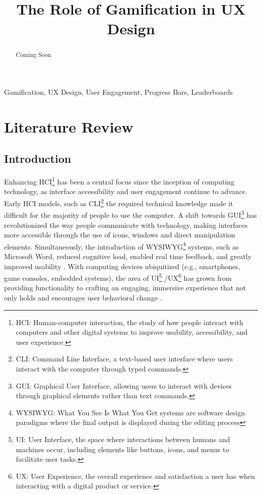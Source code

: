 \documentclass[conference]{IEEEtran}
\begin{document}
\title{The Role of Gamification in UX Design}

\author{
}

\maketitle

\begin{abstract}
Coming Soon
\end{abstract}

\begin{IEEEkeywords}
Gamification, UX Design, User Engagement, Progress Bars, Leaderboards
\end{IEEEkeywords}

\section{Literature Review}

\subsection{Introduction}

Enhancing HCI\footnote{HCI: Human-computer interaction, the study of how people interact with computers and other digital systems to improve usability, accessibility, and user experience.} has been a central focus since the inception of computing technology, as interface accessibility and user engagement continue to advance. Early HCI models, such as CLI\footnote{CLI: Command Line Interface, a text-based user interface where users interact with the computer through typed commands.} the required technical knowledge made it difficult for the majority of people to use the computer. A shift towards GUI\footnote{GUI: Graphical User Interface, allowing users to interact with devices through graphical elements rather than text commands.} \cite{curtis1989, fishkin2000} has revolutionized the way people communicate with technology, making interfaces more accessible through the use of icons, windows and direct manipulation elements. Simultaneously, the introduction of WYSIWYG\footnote{WYSIWYG: What You See Is What You Get systems are software design paradigms where the final output is displayed during the editing process} systems, such as Microsoft Word, reduced cognitive load, enabled real time feedback, and greatly improved usability \cite{marchionini1992}. With computing devices ubiquitized (e.g., smartphones, game consoles, embedded systems), the area of UI\footnote{UI: User Interface, the space where interactions between humans and machines occur, including elements like buttons, icons, and menus to facilitate user tasks.}
/UX\footnote{UX: User Experience, the overall experience and satisfaction a user has when interacting with a digital product or service.} has grown from providing functionality to crafting an engaging, immersive experience that not only holds and encourages user behavioral change \cite{deliu2017}.
\end{document}
